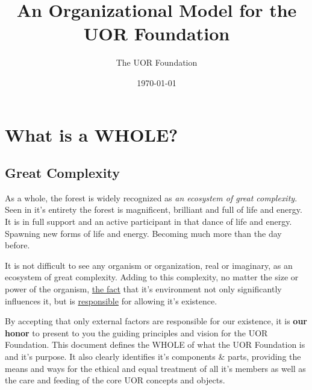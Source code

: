\documentclass[twocolumn,10pt]{article}
\title{An Organizational Model for the UOR Foundation}
\author{The UOR Foundation}
\date{\today}
\begin{document}

\section*{What is a WHOLE?}
\subsection*{Great Complexity}
As a whole, the forest is widely recognized as \textit{an ecosystem of great complexity}.
Seen in it's entirety the forest is magnificent, brilliant and full of life and energy.
It is in full support and an active participant in that dance of life and energy.
Spawning new forms of life and energy.
Becoming much more than the day before.

It is not difficult to see any organism or organization, real or imaginary, as an ecosystem of great complexity.
Adding to this complexity,  no matter the size or power of the organism, \underline{the fact} that it's environment not only significantly influences it, but is \underline{responsible} for allowing it's existence.

By accepting that only external factors are responsible for our existence, it is \textbf{our honor} to present to you the guiding principles and vision for the UOR Foundation.
This document defines the WHOLE of what the UOR Foundation is and it's purpose.
It also clearly identifies it's components \& parts, providing the means and ways for the ethical and equal treatment of all it's members as well as the care and feeding of the core UOR concepts and objects.
\end{document}
